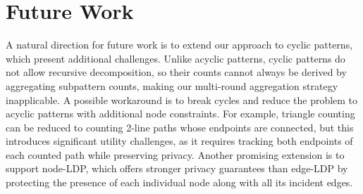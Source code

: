 \section{Future Work}
\label{sec:future_work}


{
A natural direction for future work is to extend our approach to cyclic patterns, which present additional challenges.
Unlike acyclic patterns, cyclic patterns do not allow recursive decomposition, so their counts cannot always be derived by aggregating subpattern counts, making our multi-round aggregation strategy inapplicable. 
A possible workaround is to break cycles and reduce the problem to acyclic patterns with additional node constraints. 
For example, triangle counting can be reduced to counting 2-line paths whose endpoints are connected, but this introduces significant utility challenges, as it requires tracking both endpoints of each counted path while preserving privacy.
}
Another promising extension is to support node-LDP, which offers stronger privacy guarantees than edge-LDP by protecting the presence of each individual node along with all its incident edges.



